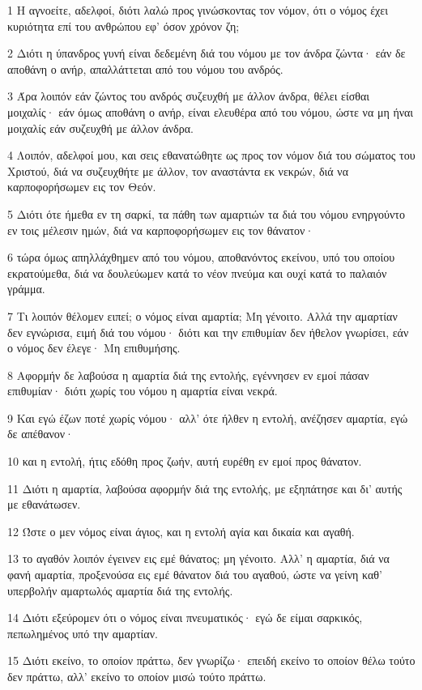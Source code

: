 \par 1 Η αγνοείτε, αδελφοί, διότι λαλώ προς γινώσκοντας τον νόμον, ότι ο νόμος έχει κυριότητα επί του ανθρώπου εφ' όσον χρόνον ζη;
\par 2 Διότι η ύπανδρος γυνή είναι δεδεμένη διά του νόμου με τον άνδρα ζώντα· εάν δε αποθάνη ο ανήρ, απαλλάττεται από του νόμου του ανδρός.
\par 3 Άρα λοιπόν εάν ζώντος του ανδρός συζευχθή με άλλον άνδρα, θέλει είσθαι μοιχαλίς· εάν όμως αποθάνη ο ανήρ, είναι ελευθέρα από του νόμου, ώστε να μη ήναι μοιχαλίς εάν συζευχθή με άλλον άνδρα.
\par 4 Λοιπόν, αδελφοί μου, και σεις εθανατώθητε ως προς τον νόμον διά του σώματος του Χριστού, διά να συζευχθήτε με άλλον, τον αναστάντα εκ νεκρών, διά να καρποφορήσωμεν εις τον Θεόν.
\par 5 Διότι ότε ήμεθα εν τη σαρκί, τα πάθη των αμαρτιών τα διά του νόμου ενηργούντο εν τοις μέλεσιν ημών, διά να καρποφορήσωμεν εις τον θάνατον·
\par 6 τώρα όμως απηλλάχθημεν από του νόμου, αποθανόντος εκείνου, υπό του οποίου εκρατούμεθα, διά να δουλεύωμεν κατά το νέον πνεύμα και ουχί κατά το παλαιόν γράμμα.
\par 7 Τι λοιπόν θέλομεν ειπεί; ο νόμος είναι αμαρτία; Μη γένοιτο. Αλλά την αμαρτίαν δεν εγνώρισα, ειμή διά του νόμου· διότι και την επιθυμίαν δεν ήθελον γνωρίσει, εάν ο νόμος δεν έλεγε· Μη επιθυμήσης.
\par 8 Αφορμήν δε λαβούσα η αμαρτία διά της εντολής, εγέννησεν εν εμοί πάσαν επιθυμίαν· διότι χωρίς του νόμου η αμαρτία είναι νεκρά.
\par 9 Και εγώ έζων ποτέ χωρίς νόμου· αλλ' ότε ήλθεν η εντολή, ανέζησεν αμαρτία, εγώ δε απέθανον·
\par 10 και η εντολή, ήτις εδόθη προς ζωήν, αυτή ευρέθη εν εμοί προς θάνατον.
\par 11 Διότι η αμαρτία, λαβούσα αφορμήν διά της εντολής, με εξηπάτησε και δι' αυτής με εθανάτωσεν.
\par 12 Ώστε ο μεν νόμος είναι άγιος, και η εντολή αγία και δικαία και αγαθή.
\par 13 το αγαθόν λοιπόν έγεινεν εις εμέ θάνατος; μη γένοιτο. Αλλ' η αμαρτία, διά να φανή αμαρτία, προξενούσα εις εμέ θάνατον διά του αγαθού, ώστε να γείνη καθ' υπερβολήν αμαρτωλός αμαρτία διά της εντολής.
\par 14 Διότι εξεύρομεν ότι ο νόμος είναι πνευματικός· εγώ δε είμαι σαρκικός, πεπωλημένος υπό την αμαρτίαν.
\par 15 Διότι εκείνο, το οποίον πράττω, δεν γνωρίζω· επειδή εκείνο το οποίον θέλω τούτο δεν πράττω, αλλ' εκείνο το οποίον μισώ τούτο πράττω.
